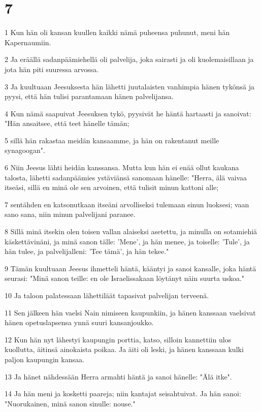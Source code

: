 \chapter{7}

\par 1 Kun hän oli kansan kuullen kaikki nämä puheensa puhunut, meni hän Kapernaumiin.
\par 2 Ja eräällä sadanpäämiehellä oli palvelija, joka sairasti ja oli kuolemaisillaan ja jota hän piti suuressa arvossa.
\par 3 Ja kuultuaan Jeesuksesta hän lähetti juutalaisten vanhimpia hänen tykönsä ja pyysi, että hän tulisi parantamaan hänen palvelijansa.
\par 4 Kun nämä saapuivat Jeesuksen tykö, pyysivät he häntä hartaasti ja sanoivat: "Hän ansaitsee, että teet hänelle tämän;
\par 5 sillä hän rakastaa meidän kansaamme, ja hän on rakentanut meille synagoogan".
\par 6 Niin Jeesus lähti heidän kanssansa. Mutta kun hän ei enää ollut kaukana talosta, lähetti sadanpäämies ystäviänsä sanomaan hänelle: "Herra, älä vaivaa itseäsi, sillä en minä ole sen arvoinen, että tulisit minun kattoni alle;
\par 7 sentähden en katsonutkaan itseäni arvolliseksi tulemaan sinun luoksesi; vaan sano sana, niin minun palvelijani paranee.
\par 8 Sillä minä itsekin olen toisen vallan alaiseksi asetettu, ja minulla on sotamiehiä käskettävinäni, ja minä sanon tälle: 'Mene', ja hän menee, ja toiselle: 'Tule', ja hän tulee, ja palvelijalleni: 'Tee tämä', ja hän tekee."
\par 9 Tämän kuultuaan Jeesus ihmetteli häntä, kääntyi ja sanoi kansalle, joka häntä seurasi: "Minä sanon teille: en ole Israelissakaan löytänyt näin suurta uskoa."
\par 10 Ja taloon palatessaan lähettiläät tapasivat palvelijan terveenä.
\par 11 Sen jälkeen hän vaelsi Nain nimiseen kaupunkiin, ja hänen kanssaan vaelsivat hänen opetuslapsensa ynnä suuri kansanjoukko.
\par 12 Kun hän nyt lähestyi kaupungin porttia, katso, silloin kannettiin ulos kuollutta, äitinsä ainokaista poikaa. Ja äiti oli leski, ja hänen kanssaan kulki paljon kaupungin kansaa.
\par 13 Ja hänet nähdessään Herra armahti häntä ja sanoi hänelle: "Älä itke".
\par 14 Ja hän meni ja kosketti paareja; niin kantajat seisahtuivat. Ja hän sanoi: "Nuorukainen, minä sanon sinulle: nouse."
